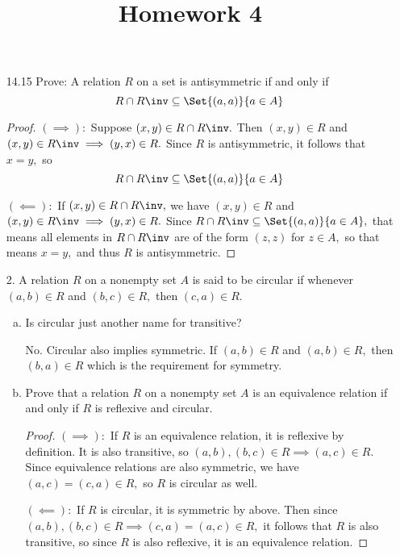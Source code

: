 \documentclass{article}
\begin{document}
\title{Homework 4}
\maketitle
\thispagestyle{fancy}

\begin{itemize}
	\item[14.15] Prove: A relation $R$ on a set is antisymmetric if and only if
		\[R\cap R\inv \subseteq \Set{(a, a)}{a\in A}\]
		\begin{proof}
			$(\implies):$ Suppose $(x, y)\in R\cap R\inv.$ Then $(x, y)\in R$ and $(x, y)\in R\inv\implies (y, x)\in R.$ Since $R$ is antisymmetric, it follows that $x=y,$ so 
			\[R\cap R\inv\subseteq \Set{(a, a)}{a\in A}\]

			$(\impliedby):$ If $(x, y)\in R\cap R\inv,$ we have $(x, y)\in R$ and $(x, y)\in R\inv\implies (y, x)\in R.$ Since $R\cap R\inv \subseteq \Set{(a, a)}{a\in A},$ that means all elements in $R\cap R\inv$ are of the form $(z, z)$ for $z\in A,$ so that means $x=y,$ and thus $R$ is antisymmetric.
		\end{proof}

	\item[2.] A relation $R$ on a nonempty set $A$ is said to be circular if whenever $(a, b)\in R$ and $(b, c)\in R,$ then $(c, a)\in R.$ 
		\begin{enumerate}[(a)]
			\item Is circular just another name for transitive?
				\begin{answer*}
					No. Circular also implies symmetric. If $(a, b)\in R$ and $(a, b)\in R,$ then $(b, a)\in R$ which is the requirement for symmetry. 
				\end{answer*}

			\item Prove that a relation $R$ on a nonempty set $A$ is an equivalence relation if and only if $R$ is reflexive and circular.
				\begin{proof}
					$(\implies):$ If $R$ is an equivalence relation, it is reflexive by definition. It is also transitive, so $(a, b), (b, c)\in R\implies (a, c)\in R.$ Since equivalence relations are also symmetric, we have $(a, c)= (c, a)\in R,$ so $R$ is circular as well.

					$(\impliedby):$ If $R$ is circular, it is symmetric by above. Then since $(a, b), (b, c)\in R\implies (c, a)=(a, c)\in R,$ it follows that $R$ is also transitive, so since $R$ is also reflexive, it is an equivalence relation.
				\end{proof}
				

\end{enumerate}
\end{itemize}
\end{document}

